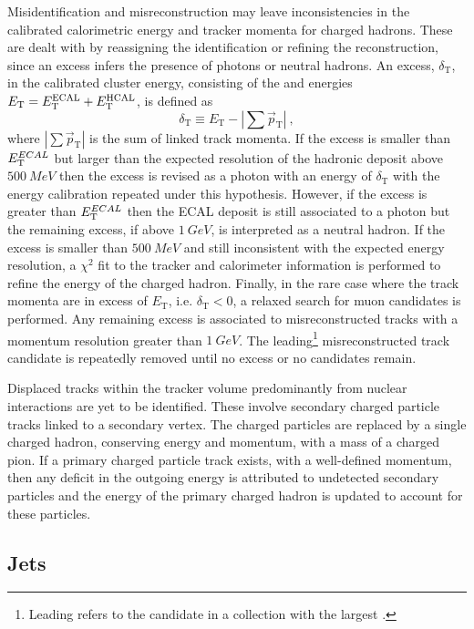 Misidentification and misreconstruction may leave inconsistencies in the calibrated calorimetric energy and tracker momenta for charged hadrons. These are dealt with by reassigning the identification or refining the reconstruction, since an excess infers the presence of photons or neutral hadrons. An excess, $\delta_\mathrm{T}$, in the calibrated cluster energy, consisting of the \ECAL and \HCAL energies $E_{\mathrm{T}}=E_{\mathrm{T}}^{\mathrm{ECAL}} + E_{\mathrm{T}}^{\mathrm{HCAL}}$, is defined as
%
\begin{equation}
    \delta_\mathrm{T} \equiv E_{\mathrm{T}} - |\sum \vec{p}_{\mathrm{T}}|\ ,
\end{equation}
%
where $|\sum \vec{p}_{\mathrm{T}}|$ is the sum of linked track momenta. If the excess is smaller than $E_{\mathrm{T}}^{ECAL}$ but larger than the expected resolution of the hadronic deposit above $\SI{500}{MeV}$ then the excess is revised as a photon with an energy of $\delta_{\mathrm{T}}$ with the energy calibration repeated under this hypothesis. However, if the excess is greater than $E_{\mathrm{T}}^{ECAL}$ then the ECAL deposit is still associated to a photon but the remaining excess, if above $\SI{1}{GeV}$, is interpreted as a neutral hadron. If the excess is smaller than $\SI{500}{MeV}$ and still inconsistent with the expected energy resolution, a $\chi^2$ fit to the tracker and calorimeter information is performed to refine the energy of the charged hadron. Finally, in the rare case where the track momenta are in excess of $E_{\mathrm{T}}$, i.e. $\delta_{\mathrm{T}}<0$, a relaxed search for muon candidates is performed. Any remaining excess is associated to misreconstructed tracks with a momentum resolution greater than ${\SI{1}{GeV}}$. The leading\footnote{Leading refers to the candidate in a collection with the largest \pt.} misreconstructed track candidate is repeatedly removed until no excess or no candidates remain.

Displaced tracks within the tracker volume predominantly from nuclear interactions are yet to be identified. These involve secondary charged particle tracks linked to a secondary vertex. The charged particles are replaced by a single charged hadron, conserving energy and momentum, with a mass of a charged pion. If a primary charged particle track exists, with a well-defined momentum, then any deficit in the outgoing energy is attributed to undetected secondary particles and the energy of the primary charged hadron is updated to account for these particles.


\subsection{Jets}

